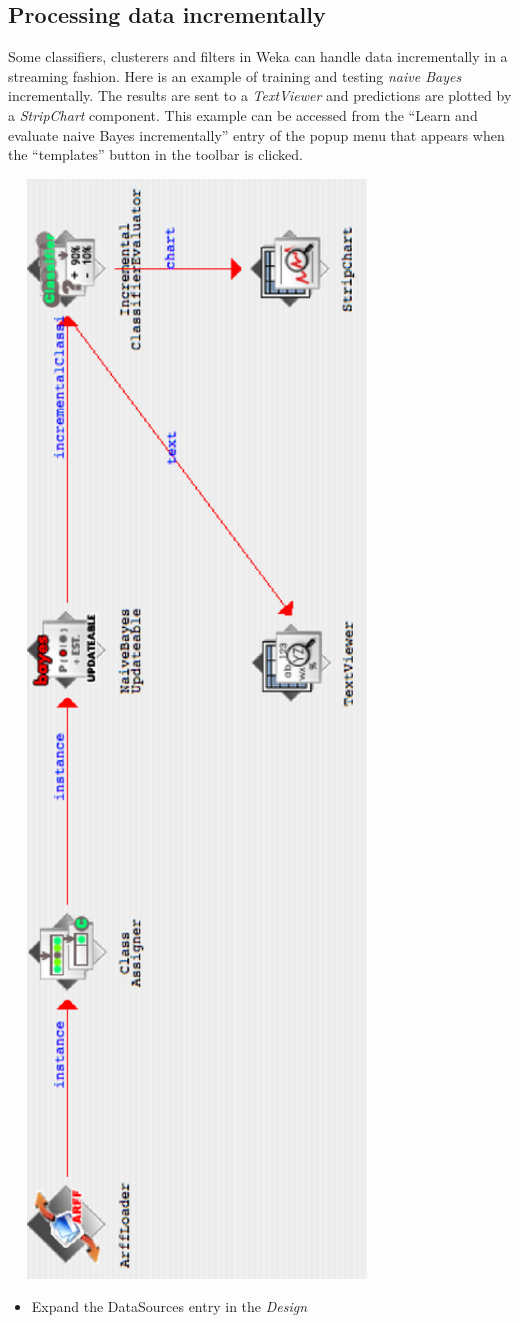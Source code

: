 \newpage
\subsection{Processing data incrementally}

Some classifiers, clusterers and filters in Weka can handle data
incrementally in a streaming fashion. Here is an example of training
and testing \textit{naive Bayes} incrementally. The results are sent
to a \textit{TextViewer} and predictions are plotted by a
\textit{StripChart} component. This example can be accessed from the
``Learn and evaluate naive Bayes incrementally'' entry of the popup menu that
appears when the ``templates'' button in the toolbar is clicked.

\begin{center}
  \includegraphics[angle=270,width=10cm]{images/knowledgeflow/IncrementalFlow.eps}
\end{center}

\begin{itemize}
        \item Expand the DataSources entry in the \textit{Design}
        
\end{itemize}
